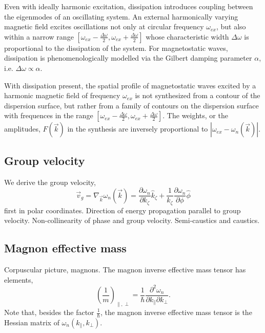 \documentclass{article}
\begin{document}
Even with ideally harmonic excitation, dissipation introduces coupling between the eigenmodes of an oscillating system. An external harmonically varying magnetic field excites oscillations not only at circular frequency $\omega_{ex}$, but also within a narrow range $[\omega_{ex} - \frac{\Delta \omega}{2}, \omega_{ex} + \frac{\Delta \omega}{2}]$ whose characteristic width $\Delta \omega$ is proportional to the dissipation of the system. For magnetostatic waves, dissipation is phenomenologically modelled via the Gilbert damping parameter $\alpha$, i.e. $\Delta \omega \propto \alpha$.

With dissipation present, the spatial profile of magnetostatic waves excited by a harmonic magnetic field of frequency $\omega_{ex}$ is not synthesized from a contour of the dispersion surface, but rather from a family of contours on the dispersion surface with frequences in the range $[\omega_{ex} - \frac{\Delta \omega}{2}, \omega_{ex} + \frac{\Delta \omega}{2}]$. The weights, or the amplitudes, $F(\vec{k})$ in the synthesis are inversely proportional to $| \omega_{ex} - \omega_{n} (\vec{k}) |$.

\subsection{Group velocity}
We derive the group velocity,
\begin{equation}
\vec{v}_{g} = \nabla_{\vec{k}} \omega_{n} (\vec{k}) = \frac{\partial \omega_{n}}{\partial k_{\zeta}} \hat{k}_{\zeta} + \frac{1}{k_{\zeta}} \frac{\partial \omega_{n}}{\partial \phi} \hat{\phi}
\end{equation}
first in polar coordinates. 
Direction of energy propagation parallel to group velocity. Non-collinearity of phase and group velocity. Semi-caustics and caustics.

\subsection{Magnon effective mass}
Corpuscular picture, magnons. The magnon inverse effective mass tensor has elements,
\begin{equation}
\left(\frac{1}{m}\right)_{\parallel , \perp} = \frac{1}{\hbar} \frac{\partial^2 \omega_{n}}{\partial k_{\parallel} \partial k_{\perp}}.
\end{equation}
Note that, besides the factor $\frac{1}{\hbar}$, the magnon inverse effective mass tensor is the Hessian matrix of $\omega_{n} ( k_{\parallel} , k_{\perp} )$.
\end{document}
